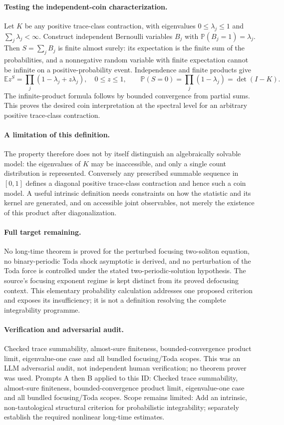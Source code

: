 \documentclass[11pt]{article}
\begin{document}
\paragraph{Testing the independent-coin characterization.}Let \(K\) be any positive trace-class contraction, with eigenvalues \(0\le\lambda_j\le1\) and \(\sum_j\lambda_j<\infty\). Construct independent Bernoulli variables \(B_j\) with \(\mathbb P(B_j=1)=\lambda_j\). Then \(S=\sum_jB_j\) is finite almost surely: its expectation is the finite sum of the probabilities, and a nonnegative random variable with finite expectation cannot be infinite on a positive-probability event. Independence and finite products give
\[\mathbb E z^S=\prod_j(1-\lambda_j+z\lambda_j),\quad0\le z\le1,\qquad
\mathbb P(S=0)=\prod_j(1-\lambda_j)=\det(I-K).
\]
The infinite-product formula follows by bounded convergence from partial sums. This proves the desired coin interpretation at the spectral level for an arbitrary positive trace-class contraction.
\paragraph{A limitation of this definition.}The property therefore does not by itself distinguish an algebraically solvable model: the eigenvalues of \(K\) may be inaccessible, and only a single count distribution is represented. Conversely any prescribed summable sequence in \([0,1]\) defines a diagonal positive trace-class contraction and hence such a coin model. A useful intrinsic definition needs constraints on how the statistic and its kernel are generated, and on accessible joint observables, not merely the existence of this product after diagonalization.
\paragraph{Full target remaining.}No long-time theorem is proved for the perturbed focusing two-soliton equation, no binary-periodic Toda shock asymptotic is derived, and no perturbation of the Toda force is controlled under the stated two-periodic-solution hypothesis. The source's focusing exponent regime is kept distinct from its proved defocusing context. This elementary probability calculation addresses one proposed criterion and exposes its insufficiency; it is not a definition resolving the complete integrability programme.

\paragraph{Verification and adversarial audit.}
Checked trace summability, almost-sure finiteness, bounded-convergence product limit, eigenvalue-one case and all bundled focusing/Toda scopes. This was an LLM adversarial audit, not independent human verification; no theorem prover was used. Prompts A then B applied to this ID: Checked trace summability, almost-sure finiteness, bounded-convergence product limit, eigenvalue-one case and all bundled focusing/Toda scopes. Scope remains limited: Add an intrinsic, non-tautological structural criterion for probabilistic integrability; separately establish the required nonlinear long-time estimates.
\end{document}
